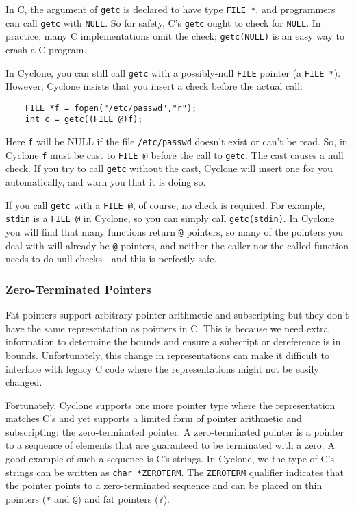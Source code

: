 In C, the argument of \texttt{getc} is declared to have type
\texttt{FILE *}, and programmers can call \texttt{getc} with
\texttt{NULL}\@.  So for safety, C's \texttt{getc} ought to check for
\texttt{NULL}\@.  In practice, many C implementations omit the check;
\texttt{getc(NULL)} is an easy way to crash a C program.

In Cyclone, you can still call \texttt{getc} with a possibly-null
\texttt{FILE} pointer (a \texttt{FILE *}).  However, Cyclone insists
that you insert a check before the actual call:
\begin{verbatim}
    FILE *f = fopen("/etc/passwd","r");
    int c = getc((FILE @)f);
\end{verbatim}
Here \texttt{f} will be NULL if the file \texttt{/etc/passwd} doesn't
exist or can't be read.  So, in Cyclone \texttt{f} must be cast to
\texttt{FILE @} before the call to \texttt{getc}.  The cast causes a
null check.  If you try to call \texttt{getc} without the cast,
Cyclone will insert one for you automatically, and warn you that it is
doing so.

If you call \texttt{getc} with a \texttt{FILE @}, of course, no check
is required.  For example, \texttt{stdin} is a \texttt{FILE @} in
Cyclone, so you can simply call \texttt{getc(stdin)}.  In Cyclone you
will find that many functions return \texttt{@} pointers, so many of
the pointers you deal with will already be \texttt{@} pointers, and
neither the caller nor the called function needs to do null
checks---and this is perfectly safe.

\subsubsection*{Zero-Terminated Pointers}

Fat pointers support arbitrary pointer arithmetic and subscripting
but they don't have the same representation as pointers in C.  This
is because we need extra information to determine the bounds and
ensure a subscript or dereference is in bounds.  Unfortunately,
this change in representations can make it difficult to interface
with legacy C code where the representations might not be easily
changed.  

Fortunately, Cyclone supports one more pointer type where the
representation matches C's and yet supports a limited form of
pointer arithmetic and subscripting:  the zero-terminated pointer.
A zero-terminated pointer is a pointer to a sequence of elements
that are guaranteed to be terminated with a zero.  A good
example of such a sequence is C's strings.  In Cyclone, we
the type of C's strings can be written as \texttt{char *ZEROTERM}.
The \texttt{ZEROTERM} qualifier indicates that the pointer
points to a zero-terminated sequence and can be placed on
thin pointers (\texttt{*} and \texttt{@}) and fat pointers (\texttt{?}).

